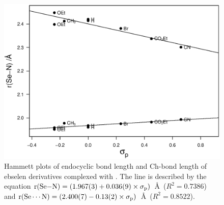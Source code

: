 \begin{refsection}
\begin{figure}
\centering
\includegraphics[width=0.7\linewidth]{Figures/hammett-morph-para.eps}
\caption[Hammett plots of endocyclic  bond length and  Ch-bond length of ebselen derivatives complexed with .]{Hammett plots of endocyclic  bond length and  Ch-bond length of ebselen derivatives complexed with . The line is described by the equation $\mathrm{r}(\ce{Se-N}) = (1.967(3) + 0.036(9) \times \sigma_\text{p})$~\AA~($R^2=0.7386$) and $\mathrm{r}(\ce{Se\cdots N}) = (2.400(7) - 0.13(2) \times \sigma_\text{p})$~\AA~($R^2=0.8522$).}\label{fig:hammett-morph-para}
\end{figure}

\begin{table}
  \caption{Linear regression results for Hammett plots in \cref{fig:hammett-dmap-para,fig:hammett-pyrrol-para,fig:hammett-morph-para}.}
  \label{tab:hammett-results-para}
\end{table}


\end{refsection}
